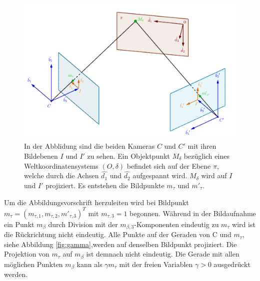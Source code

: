 \begin{figure}[!htb]
	\centering
	\includegraphics[width=0.8\linewidth]{images/HomographieDP_beschriftet.png}
	\caption[Abbildungsvorschrift in Homographien]{In der Abblidung sind die beiden Kameras $C$ und $C'$ mit ihren Bildebenen $I$ und $I'$ zu sehen. Ein Objektpunkt $M_\delta$ bezüglich eines Weltkoordinatensystems $(O,\delta)$ befindet sich auf der Ebene $\pi$, welche durch die Achsen $\hat{d_1}$ und $\hat{d_2}$ aufgespannt wird. $M_\delta$ wird auf $I$ und $I'$ projiziert. Es entstehen die Bildpunkte $m_\tau$ und $m'_\tau$.}  
	\label{fig:Homographie}
\end{figure}


Um die Abbildungsvorschrift herzuleiten wird bei  Bildpunkt \ensuremath{m_{\tau} = (m_{\tau,1},m_{\tau,2},m'_{\tau,3})^T} mit $m_{\tau,3}=1$ begonnen. Während in der Bildaufnahme ein Punkt $m_\beta$ durch Division mit der $m_{\beta,3}$-Komponenten eindeutig zu $m_{\tau}$ wird ist die Rückrichtung nicht eindeutig. Alle Punkte auf der Geraden von C und $m_{\tau}$, siehe Abbildung \ref{fig:gamma},werden auf denselben Bildpunkt projiziert. Die Projektion von $m_{\tau}$ auf $m_\beta$ ist demnach nicht eindeutig. Die Gerade mit allen möglichen Punkten $m_\beta$ kann als $\gamma m_{\tau}$ mit der freien Variablen $\gamma > 0$ ausgedrückt werden.  



